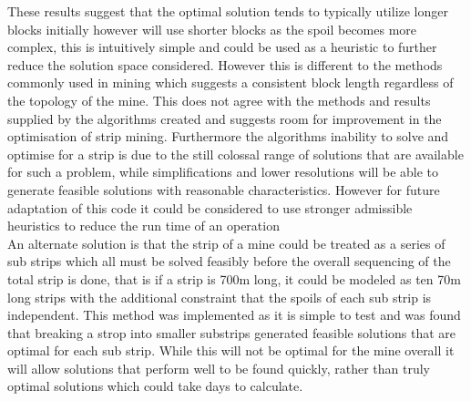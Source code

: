 These results suggest that the optimal solution tends to typically utilize longer blocks initially however will use shorter blocks as the spoil becomes more complex, this is intuitively simple and could be used as a heuristic to further reduce the solution space considered. However this is different to the methods commonly used in mining\cite{IntoOpenPit} which suggests a consistent block length regardless of the topology of the mine. This does not agree with the methods and results supplied by the algorithms created and suggests room for improvement in the optimisation of strip mining. Furthermore the algorithms inability to solve and optimise for a strip is due to the still colossal range of solutions that are available for such a problem, while simplifications and lower resolutions will be able to generate feasible solutions with reasonable characteristics. However for future adaptation of this code it could be considered to use stronger admissible heuristics to reduce the run time of an operation\\An alternate solution is that  the strip of a mine could be treated as a series of sub strips which all must be solved feasibly before the overall sequencing  of the total strip is  done, that is if a strip is 700m long, it could be modeled as ten 70m long strips with the additional constraint that the spoils of each sub strip is independent. This method was implemented as it is simple to test and was found that breaking a strop into smaller substrips generated feasible solutions that are optimal for each sub strip. While this will not be optimal for the mine overall it will allow solutions that perform well to be found quickly, rather than truly optimal solutions which could take days to calculate. 


